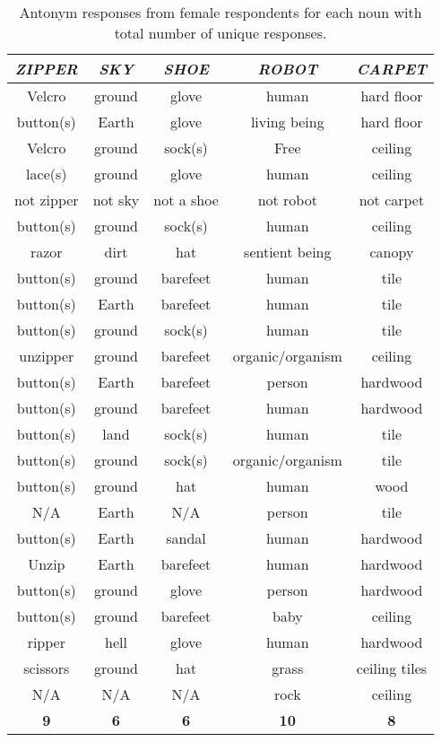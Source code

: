 \begin{table}
	\begin{center}
		\begin{tabular}{|c|c|c|c|c|} \hline
			\textit{ZIPPER} & \textit{SKY} & \textit{SHOE} & \textit{ROBOT} & \textit{CARPET} \\ \hline \hline
			Velcro		&	ground	&	glove	&	human			&	hard floor		\\
			button(s)	&	Earth	&	glove	&	living being	&	hard floor		\\
			Velcro		&	ground	&	sock(s)	&	Free			&	ceiling		\\
			lace(s)		&	ground	&	glove	&	human			&	ceiling		\\
			not zipper	&	not sky	&	not a shoe	&	not robot	&	not carpet		\\
			button(s)	&	ground	&	sock(s)		&	human		&	ceiling		\\
			razor		&	dirt	&	hat		&	sentient being	&	canopy		\\
			button(s)	&	ground	&	barefeet	&	human		&	tile		\\
			button(s)	&	Earth	&	barefeet	&	human		&	tile		\\
			button(s)	&	ground	&	sock(s)	&	human			&	tile		\\
			unzipper	&	ground	&	barefeet	&	organic/organism	&	ceiling		\\
			button(s)	&	Earth	&	barefeet	&	person		&	hardwood		\\
			button(s)	&	ground	&	barefeet	&	human		&	hardwood		\\
			button(s)	&	land	&	sock(s)	&	human			&	tile		\\
			button(s)	&	ground	&	sock(s)	&	organic/organism	&	tile		\\
			button(s)	&	ground	&	hat		&	human			&	wood		\\
			N/A			&	Earth	&	N/A		&	person			&	tile		\\
			button(s)	&	Earth	&	sandal	&	human			&	hardwood		\\
			Unzip		&	Earth	&	barefeet	&	human		&	hardwood		\\
			button(s)	&	ground	&	glove	&	person			&	hardwood		\\
			button(s)	&	ground	&	barefeet	&	baby		&	ceiling		\\
			ripper		&	hell	&	glove	&	human			&	hardwood		\\
			scissors	&	ground	&	hat		&	grass			&	ceiling tiles		\\
			N/A			&	N/A		&	N/A		&	rock			&	ceiling		\\ \hline
			\textbf{9}	&	\textbf{6}	&	\textbf{6}	&	\textbf{10}	&	\textbf{8}		\\
			\hline
		\end{tabular}
	\end{center}
	\caption {Antonym responses from female respondents for each noun with total number of unique responses.}
	\label{tab:female_noun}
\end{table}